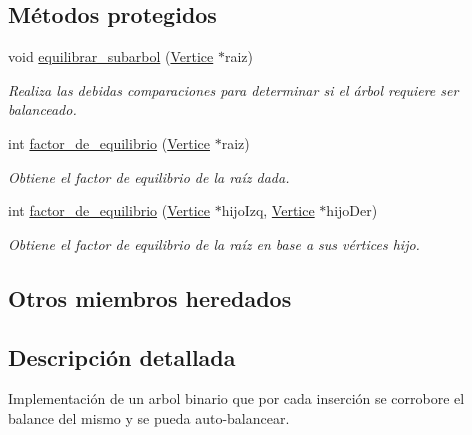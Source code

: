 \subsection*{Métodos protegidos}
\begin{DoxyCompactItemize}
\item 
void \hyperlink{classArbolAVL_ad24ffafb198dac21a98ff19e8361fbd6}{equilibrar\+\_\+subarbol} (\hyperlink{classVertice}{Vertice} $\ast$raiz)
\begin{DoxyCompactList}\small\item\em Realiza las debidas comparaciones para determinar si el árbol requiere ser balanceado. \end{DoxyCompactList}\item 
int \hyperlink{classArbolAVL_a12f2ddd1c095720faf96b5685a94e13e}{factor\+\_\+de\+\_\+equilibrio} (\hyperlink{classVertice}{Vertice} $\ast$raiz)
\begin{DoxyCompactList}\small\item\em Obtiene el factor de equilibrio de la raíz dada. \end{DoxyCompactList}\item 
int \hyperlink{classArbolAVL_a8cf229fd1482232fbfe4803043eeec14}{factor\+\_\+de\+\_\+equilibrio} (\hyperlink{classVertice}{Vertice} $\ast$hijo\+Izq, \hyperlink{classVertice}{Vertice} $\ast$hijo\+Der)
\begin{DoxyCompactList}\small\item\em Obtiene el factor de equilibrio de la raíz en base a sus vértices hijo. \end{DoxyCompactList}\end{DoxyCompactItemize}
\subsection*{Otros miembros heredados}


\subsection{Descripción detallada}
Implementación de un arbol binario que por cada inserción se corrobore el balance del mismo y se pueda auto-\/balancear. 

